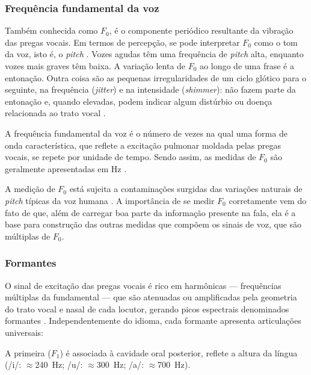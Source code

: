 		\subsubsection{Frequência fundamental da voz}
			\par Também conhecida como $F_0$, é o componente periódico resultante da vibração das pregas vocais. Em termos de percepção, se pode interpretar $F_0$ como o tom da voz, isto é, o \textit{pitch} \cite{kremer2014eficiencia}. Vozes agudas têm uma frequência de \textit{pitch} alta, enquanto vozes mais graves têm baixa. A variação lenta de $F_0$ ao longo de uma frase é a entonação. Outra coisa são as pequenas irregularidades de um ciclo glótico para o seguinte, na frequência (\textit{jitter}) e na intensidade (\textit{shimmer}): não fazem parte da entonação e, quando elevadas, podem indicar algum distúrbio ou doença relacionada ao trato vocal \cite{WERTZNER2005}.
			
			\par A frequência fundamental da voz é o número de vezes na qual uma forma de onda característica, que reflete a excitação pulmonar moldada pelas pregas vocais, se repete por unidade de tempo. Sendo assim, as medidas de $F_0$ são geralmente apresentadas em Hz \cite{freitas2013avaliaccao}.
			
			\par A medição de $F_0$ está sujeita a contaminações surgidas das variações naturais de \textit{pitch} típicas da voz humana \cite{freitas2013avaliaccao}. A importância de se medir $F_0$ corretamente vem do fato de que, além de carregar boa parte da informação presente na fala, ela é a base para construção das outras medidas que compõem os sinais de voz, que são múltiplas de $F_0$.
		
		\subsubsection{Formantes}
		\label{sec:formantes}
			\par O sinal de excitação das pregas vocais é rico em harmônicas — frequências múltiplas da fundamental — que são atenuadas ou amplificadas pela geometria do trato vocal e nasal de cada locutor, gerando picos espectrais denominados formantes \cite{valencca2014analise,fant1960acoustic}. Independentemente do idioma, cada formante apresenta articulações universais: 
			
			\par A primeira ($F_1$) é associada à cavidade oral posterior, reflete a altura da língua (/i/: $\approx$240~Hz; /u/: $\approx$300~Hz; /a/: $\approx$700~Hz).
			
